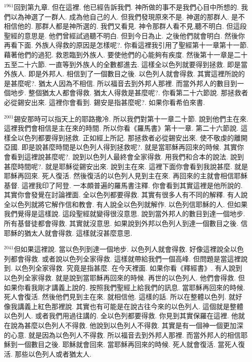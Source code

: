 \documentclass{book}
\begin{document}
$^{1961}$回到第九章.
但在這裡.
他已經告訴我們.
神所做的事不是我們心目中所想的.
我們以為神選了一群人.
成為他自己的人.
但我們發現原來不是.
神選的那群人.
是不相信他的.
那群人都是神所選的.
我們又看見.
神令那群人看不見,聽不明白.
但這段聖經的意思是.
他們曾經試過聽不明白.
但到今日為止.
之後他們就會明白.
然後你再看下面.
外族人得救的原因是怎樣呢?.
你看這裡我引用了聖經第十一章第十一節.
藉著他們的過犯.
救恩臨到外族人.
要使他們的心能夠有疾度.
然後第十一章是二十五至二十六節.
一直等到外族人的全數都進去.
這樣全以色列就要得到拯救.
即是當外族人.
即是外邦人.
相信到了一個數目之後.
以色列人就會得救.
其實這裡所說的是甚麼呢?.
猶太人因為不相信.
所以福音去到外邦人那裡.
而當外邦人的數目到一個地步.
整個猶太人都會得救.
猶太人得救是甚麼呢?.
你看第二十六節說.
那拯救者必從錫安出來.
這裡你會看到.
錫安是指甚麼呢?.
如果你看希伯來書.

$^{2001}$錫安那時可以指天上的耶路撒冷.
所以我們對第十一章二十節.
說到他們主在來.
這裡我們會相信是主在來的時間.
所以你看《羅馬書》第十一章.
第二十六節說.
這樣全以色列都要得到拯救.
正如經上所記.
那拯救者必從錫安出來.
使不敬虔的離開亞國.
即是說甚麼時間是以色列人得到拯救呢?.
就是當耶穌再回來的時候.
其實你會看到這裡說甚麼呢?.
說到以色列人最終會全家得救.
用我們和合本的說法.
說到甚麼時間呢?.
就是耶穌從錫安出來.
說到主在來.
這裡下面你會看到我說甚麼.
就是耶穌再回來.
死人復活.
然後復活的以色列人見到主在來.
再回來的主就會相信耶穌基督.
這裡我印了阿登.
一本頗普遍的羅馬書注釋.
你會看到其實這裡是他所說的.
其實你會發覺在討論裡面.
全以色列都要得救.
其實有很多人有不同的解釋.
有人說全以色列就將它解作信和教會.
有人說全以色列就解作.
以色列信耶穌的人.
但如果我們覺得是這樣說.
這段聖經就變得很沒意思.
說到當外邦人的數目到達一個地步.
所有基督徒都會得救.
其實就沒意思.
如果說到外邦以色列人到達一個數目之後.
信耶穌的猶太人就會得救.
這樣就沒甚麼意思.

$^{2041}$但如果這裡說.
當以色列到達一個地步.
以色列人就會得救.
好像這裡說全以色列都會得救.
或者說以色列全家得救.
這樣就帶給我們一個高峰.
但問題是當這裡說到.
以色列全家得救.
究竟是指甚麼.
在今天裡面.
如果你看《釋經書》.
有人說到以色列全家得救.
就是說到當耶穌再回來的時候.
再世的以色列人.
他們會得救.
但如果你看我剛才講義上說的.
按照我們聖經上給我們的訊息.
當耶穌再回來的時候.
死人會復活.
然後他們見到主在來.
就相信他.
這樣的話.
所以在整體以色列.
就好像我講義上紅色那裡說.
其實也有可能是在說古往今來的以色列人.
這個就是整體以色列人.
或者我們用過往講的.
全以色列都要得救.
你見到其實保羅在這裡.
他就在說為甚麼以色列人不得救.
他說到以色列人不得救.
其實是有一個神一個更加深的心意.
就是因為以色列人不得救.
所以福音去到外邦人那裡.
而當外邦人的相信耶穌到一個數目之後.
耶穌就會回來.
當耶穌再回來的時候.
死人就會復活.
當死人復活.
那些以色列人或者猶太人.
\end{document}
